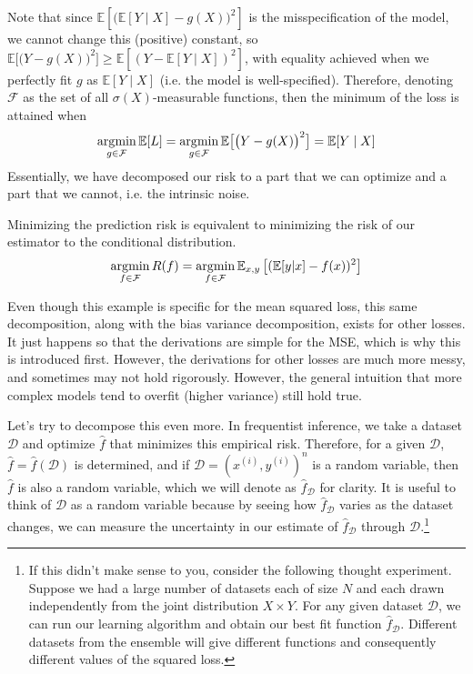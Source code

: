   Note that since $\mathbb{E}[\big(\mathbb{E}[Y \mid X] - g(X) \big)^2]$ is the misspecification of the model, we cannot change this (positive) constant, so $\mathbb{E}\big[ \big(Y - g(X)\big)^2 \big] \geq \mathbb{E}[(Y - \mathbb{E}[Y \mid X])^2]$, with equality achieved when we perfectly fit $g$ as $\mathbb{E}[Y \mid X]$ (i.e. the model is well-specified). Therefore, denoting $\mathcal{F}$ as the set of all $\sigma(X)$-measurable functions, then the minimum of the loss is attained when 
  \begin{equation}
    \argmin_{g \in \mathcal{F}} \mathbb{E}[L] = \argmin_{g \in \mathcal{F}} \mathbb{E} \big[ \big(Y - g(X)\big)^2 \big] = \mathbb{E}[Y \mid X]
  \end{equation}
  Essentially, we have decomposed our risk to a part that we can optimize and a part that we cannot, i.e. the intrinsic noise. 

  \begin{corollary}
    Minimizing the prediction risk is equivalent to minimizing the risk of our estimator to the conditional distribution. 
    \begin{equation}
      \argmin_{f \in \mathcal{F}} R(f) = \argmin_{f \in \mathcal{F}} \mathbb{E}_{x, y} \left[ (\mathbb{E}[y|x] - f(x))^2 \right]
    \end{equation}
  \end{corollary}
  
  Even though this example is specific for the mean squared loss, this same decomposition, along with the bias variance decomposition, exists for other losses. It just happens so that the derivations are simple for the MSE, which is why this is introduced first. However, the derivations for other losses are much more messy, and sometimes may not hold rigorously. However, the general intuition that more complex models tend to overfit (higher variance) still hold true. 

  Let's try to decompose this even more. In frequentist inference, we take a dataset $\mathcal{D}$ and optimize $\hat{f}$ that minimizes this empirical risk. Therefore, for a given $\mathcal{D}$, $\hat{f} = \hat{f}(\mathcal{D})$ is determined, and if $\mathcal{D} = (x^{(i)}, y^{(i)})^n$ is a random variable, then $\hat{f}$ is also a random variable, which we will denote as $\hat{f}_{\mathcal{D}}$ for clarity. It is useful to think of $\mathcal{D}$ as a random variable because by seeing how $\hat{f}_{\mathcal{D}}$ varies as the dataset changes, we can measure the uncertainty in our estimate of $\hat{f}_{\mathcal{D}}$ through $\mathcal{D}$.\footnote{If this didn't make sense to you, consider the following thought experiment. Suppose we had a large number of datasets each of size $N$ and each drawn independently from the joint distribution $X \times Y$. For any given dataset $\mathcal{D}$, we can run our learning algorithm and obtain our best fit function $\hat{f}_{\mathcal{D}}$. Different datasets from the ensemble will give different functions and consequently different values of the squared loss. }

